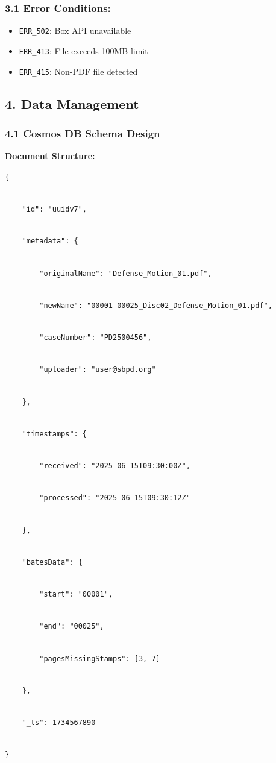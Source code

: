 \documentclass[
]{article}
\providecommand{\tightlist}{%
  \setlength{\itemsep}{0pt}\setlength{\parskip}{0pt}}
\begin{document}
\hypertarget{error-conditions}{%
\subsubsection{\texorpdfstring{\textbf{3.1} \textbf{Error
Conditions:}}{3.1 Error Conditions:}}\label{error-conditions}}

\begin{itemize}
\tightlist
\item
  \texttt{E}\texttt{RR\_502}: Box API unavailable
\item
  \texttt{ERR\_413}: File exceeds 100MB limit
\item
  \texttt{ERR\_415}: Non-PDF file detected
\end{itemize}

\hypertarget{data-management}{%
\subsection{\texorpdfstring{\textbf{4. Data
Management}}{4. Data Management}}\label{data-management}}

\hypertarget{cosmos-db-schema-design}{%
\subsubsection{\texorpdfstring{\textbf{4.1 Cosmos DB Schema
Design}}{4.1 Cosmos DB Schema Design}}\label{cosmos-db-schema-design}}

\textbf{Document Structure:}

\texttt{\{}\strut \\
\texttt{\ \ \ \ "id":\ "uuidv7",}\strut \\
\texttt{\ \ \ \ "metadata":\ \{}\strut \\
\texttt{\ \ \ \ \ \ \ \ "originalName":\ "Defense\_Motion\_01.pdf",}\strut \\
\texttt{\ \ \ \ }\texttt{\ \ \ \ "newName":\ "00001-00025\_Disc02\_Defense\_Motion\_01.pdf",}\strut \\
\texttt{\ \ \ \ \ \ \ \ "caseNumber":\ "PD2500456",}\strut \\
\texttt{\ \ \ \ \ \ \ \ "uploader":\ "user@sbpd.org"}\strut \\
\texttt{\ \ \ \ \},}\strut \\
\texttt{\ \ \ \ "timestamps":\ \{}\strut \\
\texttt{\ \ \ \ \ \ \ \ "received":\ "2025-06-15T09:30:00Z",}\strut \\
\texttt{\ \ \ \ \ \ \ \ "processed":\ "2025-06-15T09:30:12Z"}\strut \\
\texttt{\ \ \ \ \},}\strut \\
\texttt{\ \ \ \ "batesData":\ \{}\strut \\
\texttt{\ \ \ \ \ \ \ \ "start":\ "00001",}\strut \\
\texttt{\ \ \ \ \ \ \ \ "end":\ "00025",}\strut \\
\texttt{\ \ \ \ \ \ \ \ "pagesMissingStamps":\ {[}3,\ 7{]}}\strut \\
\texttt{\ \ \ \ \},}\strut \\
\texttt{\ \ \ \ "\_ts":\ 1734567890}\strut \\
\texttt{\}}
\end{document}
